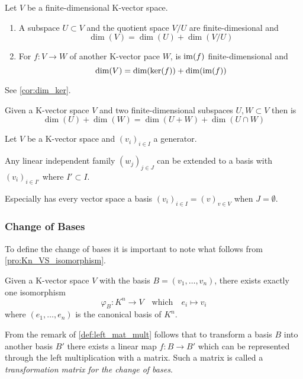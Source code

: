\begin{proposition}\label{pro:dimesion_formulas}
   Let \(V\) be a finite-dimensional K-vector space.
   \begin{enumerate}[label=\roman*, align=Center]
      \item A subspace \(U \subset V\) and the quotient space \(V/U\) are finite-dimesional and
         \[\dim(V) = \dim(U) + \dim(V/U)\]
      \item For \(f: V \to W\) of another K-vector pace \(W\), is \(\operatorname{im}(f)\) finite-dimensional and
         \[\dim(V) = \dim(\ker(f)) + \dim(\operatorname{im}(f))\]
   \end{enumerate}
\end{proposition}
\begin{remark}
   See \cref{cor:dim_ker}.
\end{remark}

\begin{corollary}
   Given a K-vector space \(V\) and two finite-dimensional subspaces \(U, W \subset V\) then is
   \[\dim(U) + \dim(W) = \dim(U+W) + \dim(U \cap W)\]
\end{corollary}

\begin{proposition}
   Let \(V\) be a K-vector space and \((v_i)_{i \in I}\) a generator.

   Any linear independent family \((w_j)_{j \in J}\) can be extended to a basis with \((v_i)_{i \in I'}\) where \(I' \subset I\).
\end{proposition}
\begin{remark}
   Especially has every vector space a basis \((v_i)_{i \in I} = (v)_{v \in V}\) when \(J = \emptyset\).
\end{remark}

\subsubsection{Change of Bases}
To define the change of bases it is important to note what follows from \cref{pro:Kn_VS_isomorphism}.
\begin{remark}
   Given a K-vector space \(V\) with the basis \(B = (v_1, \ldots, v_n)\), there exists exactly one isomorphism
   \[\varphi_{B}: K^n \to V \quad\text{which}\quad e_i \mapsto v_i\]
   where \((e_1, \ldots, e_n)\) is the canonical basis of \(K^n\).
\end{remark}

From the remark of \cref{def:left_mat_mult} follows that to transform a basis \(B\) into another basis \(B'\) there exists a linear map \(f: B \to B'\) which can be represented through the left multiplication with a matrix.
Such a matrix is called a \emph{transformation matrix for the change of bases}.

